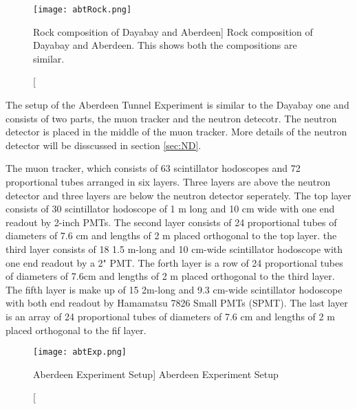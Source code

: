 \begin{figure}
    \label{fig:abtRock.png}
    \centering
    \texttt{[image: abtRock.png]}
    \caption
    [Rock composition of Dayabay and Aberdeen]
    {Rock composition of Dayabay and Aberdeen. This shows both the compositions are similar.}
    \end{figure}


The setup of the Aberdeen Tunnel Experiment is similar to the Dayabay one and consists of
two parts, the muon tracker and the neutron detecotr. The neutron detector is placed in the
middle of the muon tracker.
More details of the neutron detector will be disscussed in section \ref{sec:ND}.

The muon tracker, which consists of 63 scintillator hodoscopes and 72 proportional
tubes arranged in six layers.
Three layers are above the neutron detector and three layers are below the neutron detector seperately.
The top layer consists of 30 scintillator hodoscope of 1 m long and 10 cm wide with
one end readout by 2-inch PMTs. The second layer consists of 24 proportional tubes of diameters of
7.6 cm and lengths of 2 m placed orthogonal to the top layer. the third layer consists of 18 1.5 m-long
and 10 cm-wide scintillator hodoscope with one end readout by a 2" PMT. The forth layer is a row
of 24 proportional tubes of diameters of 7.6cm and lengths of 2 m placed orthogonal to the third layer.
The fifth layer is make up of 15 2m-long and 9.3 cm-wide scintillator hodoscope with both end
readout by Hamamatsu 7826 Small PMTs (SPMT). The last layer is an array of 24 proportional tubes
of diameters of 7.6 cm and lengths of 2 m placed  orthogonal to the fif layer.




\begin{figure}
    \label{fig:abtExp.png}
    \centering
    \texttt{[image: abtExp.png]}
    \caption
    [Aberdeen Experiment Setup]
    {Aberdeen Experiment Setup}
    \end{figure}



